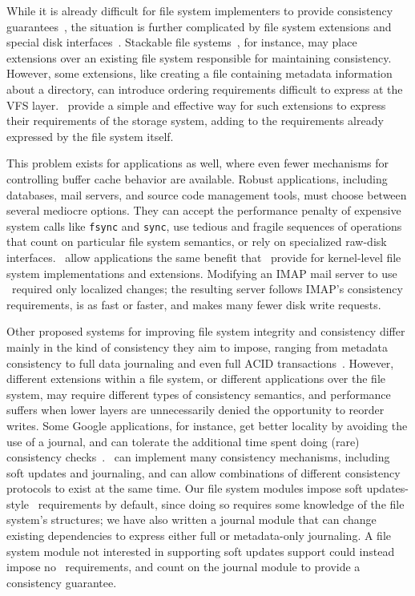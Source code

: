 While it is already difficult for file system implementers to provide
 consistency guarantees~\cite{tweedie98journaling,mckusick99soft},
 the situation is further complicated by file system extensions and
 special disk interfaces~\cite{soules03metadata,fast04versionfs,quinlan02venti,cornell04wayback,wright03ncryptfs,sivathanu03semantically-smart,sivathanu05database-aware}.
%
Stackable file systems~\cite{zadok00fist,zadok99extending,heidemann94filesystem,rosenthal90evolving},
 for instance, may place extensions over an existing file system
 responsible for maintaining consistency.
%
However, some extensions, like creating a file containing metadata
 information about a directory, can introduce ordering requirements
 difficult to express at the VFS layer.
%
\Patches\ provide a simple and effective way for such extensions to
 express their requirements of the storage system, adding to the
 requirements already expressed by the file system itself.


This problem exists for applications as well, where even fewer mechanisms
 for controlling buffer cache behavior are available.
%
Robust applications, including databases, mail servers, and source code
 management tools, must choose between several mediocre options.
%
They can accept the performance penalty of expensive system calls like
 \texttt{fsync} and \texttt{sync}, use tedious and fragile sequences
 of operations that count on particular file system semantics, or
 rely on specialized raw-disk interfaces.
%
\Patchgroups\ allow applications the same benefit that \patches\ provide
 for kernel-level file system implementations and extensions.
%
Modifying an IMAP mail server to use \patchgroups\ required only localized
 changes; the resulting server follows IMAP's consistency requirements,
 is as fast or faster, and makes many fewer disk write requests.


Other proposed systems for improving file system integrity and consistency
 differ mainly in the kind of consistency they aim to impose, ranging from
 metadata consistency to full data journaling and even full ACID
 transactions~\cite{gal05transactional,liskov04transactional}.
%
However, different extensions within a file system, or different
 applications over the file system, may require different types of
 consistency semantics, and performance suffers when lower layers are
 unnecessarily denied the opportunity to reorder writes.
%
Some Google applications, for instance, get better locality by avoiding the
 use of a journal, and can tolerate the additional time spent doing (rare)
 consistency checks~\cite{googleext2}.
%
\Patches\ can implement many consistency mechanisms, including
 soft updates and journaling, and can allow combinations of different
 consistency protocols to exist at the same time.
%
Our file system modules impose soft updates-style \patch\ requirements by
 default, since doing so requires some knowledge of the file system's
 structures; we have also written a journal module that can change
 existing dependencies to express either full or metadata-only journaling.
%
A file system module not interested in supporting soft updates support
 could instead impose no \patch\ requirements, and count on the journal
 module to provide a consistency guarantee.


